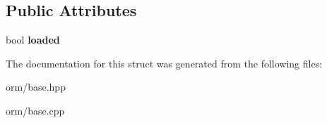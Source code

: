 \subsection*{Public Attributes}
\begin{DoxyCompactItemize}
\item 
\mbox{\label{structmods_1_1orm_1_1base_a3e1ca90438b2d8f691b432b9e88e7282}} 
bool {\bfseries loaded}
\end{DoxyCompactItemize}


The documentation for this struct was generated from the following files\+:\begin{DoxyCompactItemize}
\item 
orm/base.\+hpp\item 
orm/base.\+cpp\end{DoxyCompactItemize}

